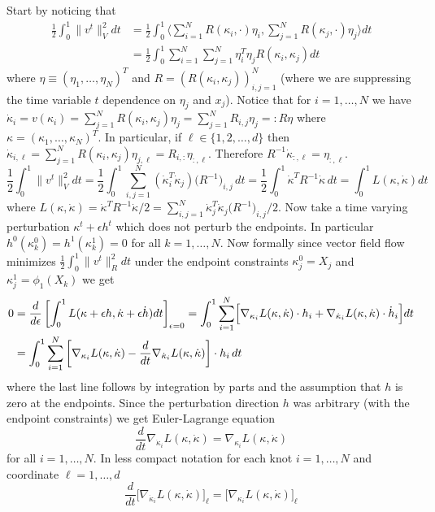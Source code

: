 \documentclass[noinfoline]{imsart}
\begin{document}
{Start by noticing that 
\begin{align*}
\frac{1}{2}\int_0^1 \| v^t  \|^2_V dt &=  \frac{1}{2}\int_0^1  \langle \sum_{i=1}^N R(\kappa_i,\cdot ) \eta_i, \sum_{j=1}^N R(\kappa_j,\cdot ) \eta_j\rangle dt \\
&= \frac{1}{2}\int_0^1 \sum_{i=1}^N \sum_{j=1}^N \eta_i^T \eta_j R(\kappa_i,\kappa_j) dt 
\end{align*}
where $\eta\equiv (\eta_1,\ldots,\eta_N)^T$ and $R=(R(\kappa_i,\kappa_j))_{i,j = 1}^N$ (where we are suppressing the time variable $t$ dependence on $\eta_j$ and $x_j$). Notice that for $i=1,\ldots, N$ we have $\dot \kappa_i = v(\kappa_i)= \sum_{j=1}^N R(\kappa_i,\kappa_j) \eta_j=\sum_{j=1}^N R_{i,j} \eta_j =: R\eta$ where $\kappa = (\kappa_1,\ldots, \kappa_N)^T$.
In particular, if $\ell\in \{ 1,2,\ldots, d \}$ then $\dot \kappa_{i,\ell} =\sum_{j=1}^N R(\kappa_i,\kappa_j) \eta_{j,\ell} =  R_{i,:} \eta_{:,\ell}$. Therefore $ R^{-1} \dot \kappa_{:,\ell} =\eta_{:,\ell}$.
\[ \frac{1}{2}\int_0^1 \| v^t  \|^2_V dt =  \frac{1}{2}\int_0^1 \sum_{i,j=1}^N (\dot\kappa_i^T\dot\kappa_j) \bigl(R^{-1}\bigr)_{i,j} \, dt  =  \frac{1}{2}\int_0^1 \dot\kappa^T R^{-1} \dot\kappa \, dt  = \int_0^1 L(\kappa,\dot\kappa) dt   \]
where $L(\kappa,\dot\kappa) =\dot\kappa^T R^{-1} \dot\kappa/2= \sum_{i,j=1}^N \dot\kappa_j^T\dot\kappa_j \bigl(R^{-1}\bigr)_{i,j} /2$.
 Now take a time varying perturbation $\kappa^t +\epsilon h^t$ which does not perturb the endpoints. In particular $h^0(\kappa^0_k)=h^1(\kappa^1_k)=0$ for all $k=1,\ldots, N$. Now formally since vector field flow minimizes $\frac{1}{2}\int_0^1 \| v^t  \|^2_R dt$ under the endpoint constraints $\kappa_j^{0}=X_j$ and $\kappa_j^{1}=\phi_1(X_k)$ we get 
\begin{align*}
0&=\frac{d}{d\epsilon} \left[\int_0^1 L(\kappa+\epsilon h,\dot \kappa+\epsilon \dot h)dt\right]_{\epsilon = 0} 
=\int_0^1\sum_{i=1}^N \Bigl[ \nabla_{\kappa_i}L(\kappa,\dot \kappa)\cdot h_i + \nabla_{\dot\kappa_i}L(\kappa,\dot \kappa)\cdot \dot h_i\Bigr]  dt  \\
&=\int_0^1\sum_{i=1}^N  \left[ \nabla_{\kappa_i} L(\kappa,\dot \kappa) - \frac{d}{dt} \nabla_{\dot\kappa_i}L (\kappa,\dot \kappa)\right] \cdot h_i  \, dt 
\end{align*}
where the last line follows by integration by parts and the assumption that $h$ is zero at the endpoints. Since the perturbation direction $h$ was arbitrary (with the endpoint constraints) we get Euler-Lagrange equation
\begin{equation}
\label{EL}
 \frac{d}{dt}\nabla_{\dot\kappa_i} L(\kappa,\dot \kappa) =  \nabla_{\kappa_i} L(\kappa,\dot \kappa)
\end{equation}
for all $i=1,\ldots, N$.
In less compact notation for each knot $i=1,\ldots, N$ and coordinate $\ell = 1,\ldots, d$
\begin{equation}
\label{EL}
 \frac{d}{dt}\bigl[\nabla_{\dot\kappa_i} L(\kappa,\dot \kappa)\bigr]_\ell = \bigl[ \nabla_{\kappa_i} L(\kappa,\dot \kappa)\bigr]_{\ell}
\end{equation}

}
\end{document}
